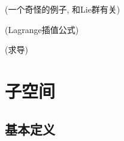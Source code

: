 %
\begin{example}
(一个奇怪的例子, 和Lie群有关)
\end{example}
%
\begin{example}
(Lagrange插值公式)
\end{example}
%
\begin{example}
(求导)
\end{example}

\section{子空间}

\subsection{基本定义}

